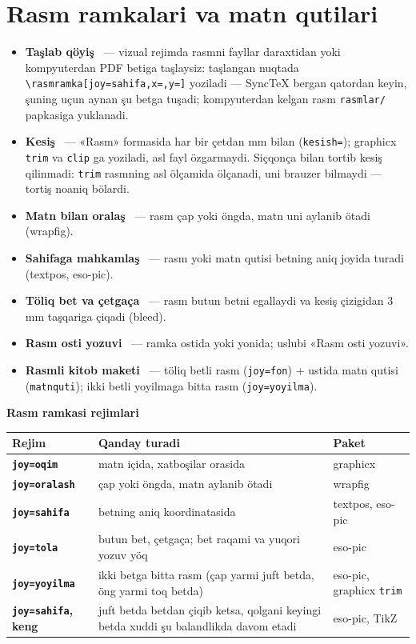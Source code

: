 \section{Rasm ramkalari va matn qutilari}\label{sec:sd-ramka}
\begin{itemize}
\item \textbf{Taşlab qöyiş} \beta\ --- vizual rejimda rasmni fayllar daraxtidan yoki kompyuterdan PDF betiga taşlaysiz: taşlangan nuqtada \texttt{\textbackslash rasmramka[joy=sahifa,x=,y=]} yoziladi --- SyncTeX bergan qatordan keyin, şuning uçun aynan şu betga tuşadi; kompyuterdan kelgan rasm \texttt{rasmlar/} papkasiga yuklanadi.
\item \textbf{Kesiş} \beta\ --- «Rasm» formasida har bir çetdan mm bilan (\texttt{kesish=}); graphicx \texttt{trim} va \texttt{clip} ga yoziladi, asl fayl özgarmaydi. Siçqonça bilan tortib kesiş qilinmadi: \texttt{trim} rasmning asl ölçamida ölçanadi, uni brauzer bilmaydi --- tortiş noaniq bölardi.
\item \textbf{Matn bilan oralaş} \beta\ --- rasm çap yoki öngda, matn uni aylanib ötadi (wrapfig).
\item \textbf{Sahifaga mahkamlaş} \beta\ --- rasm yoki matn qutisi betning aniq joyida turadi (textpos, eso-pic).
\item \textbf{Töliq bet va çetgaça} \beta\ --- rasm butun betni egallaydi va kesiş çizigidan 3 mm taşqariga çiqadi (bleed).
\item \textbf{Rasm osti yozuvi} \beta\ --- ramka ostida yoki yonida; uslubi «Rasm osti yozuvi».
\item \textbf{Rasmli kitob maketi} \beta\ --- töliq betli rasm (\texttt{joy=fon}) + ustida matn qutisi (\texttt{matnquti}); ikki betli yoyilmaga bitta rasm (\texttt{joy=yoyilma}).
\end{itemize}

\textbf{Rasm ramkasi rejimlari}
\begin{center}\footnotesize
\begin{tabularx}{\linewidth}{>{\bfseries}p{28mm}X>{\raggedright\arraybackslash}p{36mm}}
\toprule
Rejim & Qanday turadi & Paket\\
\midrule
\texttt{joy=oqim} & matn içida, xatboşilar orasida & graphicx\\
\texttt{joy=oralash} & çap yoki öngda, matn aylanib ötadi & wrapfig\\
\texttt{joy=sahifa} & betning aniq koordinatasida & textpos, eso-pic\\
\texttt{joy=tola} & butun bet, çetgaça; bet raqami va yuqori yozuv yöq & eso-pic\\
\texttt{joy=yoyilma} & ikki betga bitta rasm (çap yarmi juft betda, öng yarmi toq betda) & eso-pic, graphicx \texttt{trim}\\
\texttt{joy=sahifa}, keng & juft betda betdan çiqib ketsa, qolgani keyingi betda xuddi şu balandlikda davom etadi & eso-pic, TikZ\\
\bottomrule
\end{tabularx}
\end{center}

